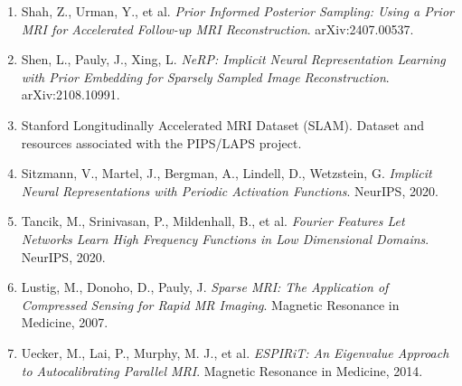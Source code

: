 \documentclass[11pt,a4paper]{article}
\begin{document}
\begin{enumerate}
    \item Shah, Z., Urman, Y., et al. \textit{Prior Informed Posterior Sampling: Using a Prior MRI for Accelerated Follow-up MRI Reconstruction}. arXiv:2407.00537.

    \item Shen, L., Pauly, J., Xing, L. \textit{NeRP: Implicit Neural Representation Learning with Prior Embedding for Sparsely Sampled Image Reconstruction}. arXiv:2108.10991.

    \item Stanford Longitudinally Accelerated MRI Dataset (SLAM). Dataset and resources associated with the PIPS/LAPS project.

    \item Sitzmann, V., Martel, J., Bergman, A., Lindell, D., Wetzstein, G. \textit{Implicit Neural Representations with Periodic Activation Functions}. NeurIPS, 2020.

    \item Tancik, M., Srinivasan, P., Mildenhall, B., et al. \textit{Fourier Features Let Networks Learn High Frequency Functions in Low Dimensional Domains}. NeurIPS, 2020.

    \item Lustig, M., Donoho, D., Pauly, J. \textit{Sparse MRI: The Application of Compressed Sensing for Rapid MR Imaging}. Magnetic Resonance in Medicine, 2007.

    \item Uecker, M., Lai, P., Murphy, M. J., et al. \textit{ESPIRiT: An Eigenvalue Approach to Autocalibrating Parallel MRI}. Magnetic Resonance in Medicine, 2014.
\end{enumerate}
\end{document}
